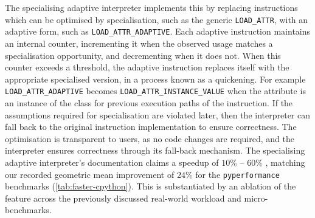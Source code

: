 The specialising adaptive interpreter implements this by replacing instructions which can be optimised by specialisation, such as the generic \texttt{LOAD\_ATTR}, with an adaptive form, such as \texttt{LOAD\_ATTR\_ADAPTIVE}. Each adaptive instruction maintains an internal counter, incrementing it when the observed usage matches a specialisation opportunity, and decrementing when it does not. When this counter exceeds a threshold, the adaptive instruction replaces itself with the appropriate specialised version, in a process known as a quickening. For example \texttt{LOAD\_ATTR\_ADAPTIVE} becomes \texttt{LOAD\_ATTR\_INSTANCE\_VALUE} when the attribute is an instance of the class for previous execution paths of the instruction.
If the assumptions required for specialisation are violated later, then the interpreter can fall back to the original instruction implementation to ensure correctness.
The optimisation is transparent to users, as no code changes are required, and the interpreter ensures correctness through its fall-back mechanism.
The specialising adaptive interpreter's documentation claims a speedup of $10\%$ -- $60\%$ \cite{pep659}, matching our recorded geometric mean improvement of $24\%$ for the \texttt{pyperformance} benchmarks (\autoref{tab:faster-cpython}).
This is substantiated by an ablation of the feature across the previously discussed real-world workload and micro-benchmarks.



